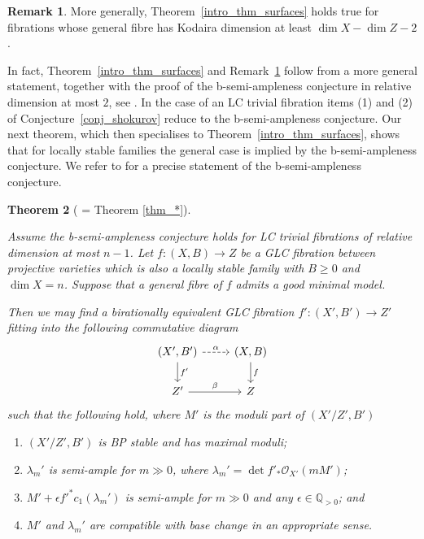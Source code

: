 \documentclass[12pt]{amsart}
\theoremstyle{plain}
\newtheorem{theorem}{Theorem}[section]
\theoremstyle{definition}
\newtheorem{remark}[theorem]{Remark}
\def\dim{\operatorname{dim}}
\def\det{\operatorname{det}}
\newcommand{\margg}[1]{\normalsize{{\color{red}\footnote{{\color{red}#1}}}{\marginpar[{\color{red}\hfill\tiny\thefootnote$\rightarrow$}]{{\color{red}$\leftarrow$\tiny\thefootnote}}}}}
\newcommand{\Ste}[1]{\margg{(Ste) #1}}
\def \QP {\mathbb Q_{>0}}
\begin{document}
\begin{remark}\label{rmk_intro}
More generally, Theorem~\ref{intro_thm_surfaces} holds true for fibrations whose general fibre has Kodaira dimension at least $\dim X - \dim Z - 2$.
\end{remark}

In fact, Theorem~\ref{intro_thm_surfaces} and Remark~\ref{rmk_intro} follow from a more general statement, together with the proof of the b-semi-ampleness
conjecture in relative dimension at most $2$, see \cite{ps09,Fujino03,Fil20b,Gio22}.
In the case of an LC trivial fibration items (1) and (2) of Conjecture~\ref{conj_shokurov}
reduce to the b-semi-ampleness conjecture. 
Our next theorem, which then specialises to Theorem~\ref{intro_thm_surfaces}, shows that for locally stable families the general
case is implied by the b-semi-ampleness conjecture.  We refer to  
\cite[Conjecture 7.13.1]{ps09} for a precise statement of the b-semi-ampleness conjecture.



\begin{theorem}[ = Theorem \ref{thm_*}]\label{main_thm_intro}

Assume the b-semi-ampleness conjecture holds for LC trivial fibrations of relative dimension at most $n-1$.
Let $f\colon (X, B) \rightarrow Z$ be a GLC fibration between projective varieties which is also a locally stable family with $B \geq 0$ and $\dim X= n$.
Suppose that a general fibre of $f$ admits a good minimal model.


Then we may find a birationally equivalent GLC fibration 
$f'\colon (X', B') \rightarrow Z'$
fitting into the following commutative diagram
\[
\begin{tikzcd}
  (X', B') \arrow[r, "\alpha", dashrightarrow] \arrow[d, "f'"] & (X, B) \arrow[d, "f"] \\
  Z' \arrow[r, "\beta"] &  Z
 \end{tikzcd}
\]
such that the following hold, where $M'$ is the moduli part of $(X'/Z', B')$

 
\begin{enumerate}
\item $(X'/Z', B')$ is BP stable and has maximal moduli;

\item $\lambda_m'$ is semi-ample for $m\gg 0$,
where $\lambda_m' = \det f'_*\mathcal O_{X'}(mM')$;

\item $M'+\epsilon f'^*c_1(\lambda_m')$ is semi-ample for $m\gg 0$ and any $\epsilon \in \QP$; and 


\item $M'$ and $\lambda_m'$ are compatible with base change in an appropriate sense.
\end{enumerate}

\end{theorem}
\end{document}
